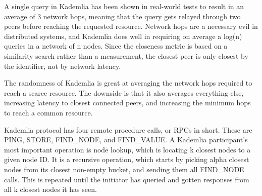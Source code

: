 A single query in Kademlia has been shown in real-world tests to result in an average of 3 network hops, meaning that the query gets relayed through two peers before reaching the requested resource.\cite{Roos2013-mb} Network hops are a necessary evil in distributed systems, and Kademlia does well in requiring on average a log(n) queries in a network of n nodes. Since the closeness metric is based on a similarity search rather than a measurement, the closest peer is only closest by the identifier, not by network latency.\cite{Eigenmann2020-zm}
						
The randomness of Kademlia is great at averaging the network hops required to reach a scarce resource. The downside is that it also averages everything else, increasing latency to closest connected peers, and increasing the minimum hops to reach a common resource.

Kademlia protocol has four remote procedure calls, or RPCs in short. These are PING, STORE, FIND\_NODE, and FIND\_VALUE. A Kademlia participant's most important operation is node lookup, which is locating k closest nodes to a given node ID. It is a recursive operation, which starts by picking alpha closest nodes from its closest non-empty bucket, and sending them all FIND\_NODE calls. This is repeated until the initiator has queried and gotten responses from all k closest nodes it has seen.
